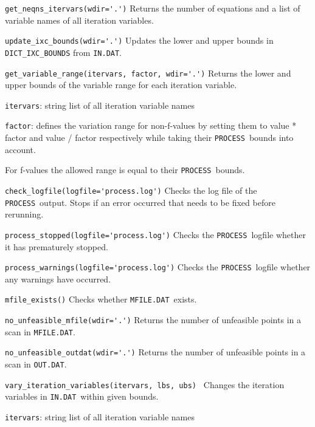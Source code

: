 \documentclass[11pt,a4paper]{article}
\newcommand{\indat}{\mbox{\texttt{IN.DAT}}}
\newcommand{\mfile}{\mbox{\texttt{MFILE.DAT}}}
\newcommand{\outdat}{\mbox{\texttt{OUT.DAT}}}
\newcommand{\process}{\mbox{\texttt{PROCESS}}}
\begin{document}
\begin{description}

\item{\verb|get_neqns_itervars(wdir='.')| } Returns the number of equations
  and a list of variable names of all iteration variables.

\item{\verb|update_ixc_bounds(wdir='.')|} Updates the lower and upper bounds
  in \verb|DICT_IXC_BOUNDS| from \indat.

\item{\verb|get_variable_range(itervars, factor, wdir='.')|} Returns the lower
  and upper bounds of the variable range for each iteration variable.

  \texttt{itervars}: string list of all iteration variable names

  \texttt{factor}: defines the variation range for non-f-values by setting
  them to value * factor and value / factor respectively while taking their
  \process\ bounds into account.

  For f-values the allowed range is equal to their \process\ bounds.

\item{\verb|check_logfile(logfile='process.log')|} Checks the log file of the
  \process\ output.  Stops if an error occurred that needs to be fixed before
  rerunning.

\item{\verb|process_stopped(logfile='process.log')|} Checks the \process\
  logfile whether it has prematurely stopped.

\item{\verb|process_warnings(logfile='process.log')|} Checks the \process\
  logfile whether any warnings have occurred.

\item{\verb|mfile_exists()|} Checks whether \mfile\ exists.

\item{\verb|no_unfeasible_mfile(wdir='.')|} Returns the number of unfeasible
  points in a scan in \mfile.

\item{\verb|no_unfeasible_outdat(wdir='.')|} Returns the number of unfeasible
  points in a scan in \outdat.

\item{\verb|vary_iteration_variables(itervars, lbs, ubs) |} Changes the
  iteration variables in \indat\ within given bounds.

  \texttt{itervars}: string list of all iteration variable names


\end{description}
\end{document}
